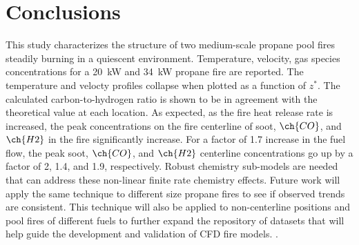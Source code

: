 \documentclass[12pt]{ussci}
\begin{document}
\section{Conclusions}
This study characterizes the structure of two medium-scale propane pool fires steadily burning in a quiescent environment. Temperature, velocity, gas species concentrations for a 20~kW and 34~kW propane fire are reported. The temperature and velocty profiles collapse when plotted as a function of $z^*$. The calculated carbon-to-hydrogen ratio is shown to be in agreement with the theoretical value at each location. As expected, as the fire heat release rate is increased, the peak concentrations on the fire centerline of soot, $\ch{CO}$, and $\ch{H2}$ in the fire significantly increase.  For a factor of 1.7 increase in the fuel flow, the peak soot, $\ch{CO}$, and $\ch{H2}$ centerline concentrations go up by a factor of 2, 1.4, and 1.9, respectively.  Robust chemistry sub-models are needed that can address these non-linear finite rate chemistry effects. Future work will apply the same technique to different size propane fires to see if observed trends are consistent. This technique will also be applied to non-centerline positions and pool fires of different fuels to further expand the repository of datasets that will help guide the development and validation of CFD fire models. . 


%

\printbibliography
\end{document}
